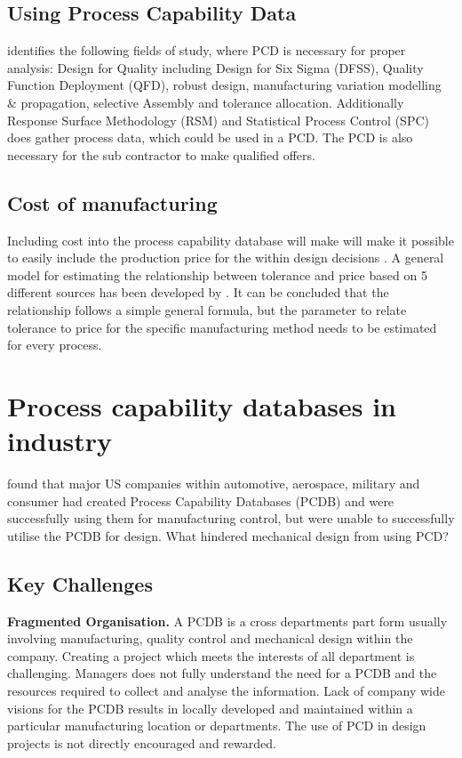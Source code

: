 \documentclass[aip,amsmath,reprint, author-year]{revtex4-1}
\begin{document}
\subsection{Using Process Capability Data}
\cite{kern2003forecasting} identifies the following fields of study, where PCD is necessary for proper analysis: Design for Quality including Design for Six Sigma (DFSS), Quality Function Deployment (QFD), robust design, manufacturing variation modelling \& propagation, selective Assembly and tolerance allocation. 
Additionally Response Surface Methodology (RSM) and Statistical Process Control (SPC) does gather process data, which could be used in a PCD. 
The PCD is also necessary for the sub contractor to make qualified offers.


\subsection{Cost of manufacturing}
Including cost into the process capability database will make will make it possible to easily include the production price for the within design decisions \citep{perzyk1998selection, thornton2000use}. 
A general model for estimating the relationship between tolerance and price based on 5 different sources has been developed by \cite{sfantsikopoulos1990cost}.
It can be concluded that the relationship follows a simple general formula, but the parameter to relate tolerance to price for the specific manufacturing method needs to be estimated for every process. 




\section{Process capability databases in industry}
\cite{tata1999effective, tata1999process} found that major US companies within automotive, aerospace, military and consumer had created Process Capability Databases (PCDB) and were successfully using them for manufacturing control, but were unable to successfully utilise the PCDB for design. What hindered mechanical design from using PCD? 

\subsection{Key Challenges}
\textbf{Fragmented Organisation.}  A PCDB is a cross departments part form usually involving manufacturing, quality control and mechanical design within the company. 
Creating a project which meets the interests of all department is challenging. 
Managers does not fully understand the need for a PCDB and the resources required to collect and analyse the information. 
Lack of company wide visions for the PCDB results in locally developed and maintained within a particular manufacturing location or departments. 
The use of PCD in design projects is not directly encouraged and rewarded. 
\end{document}
